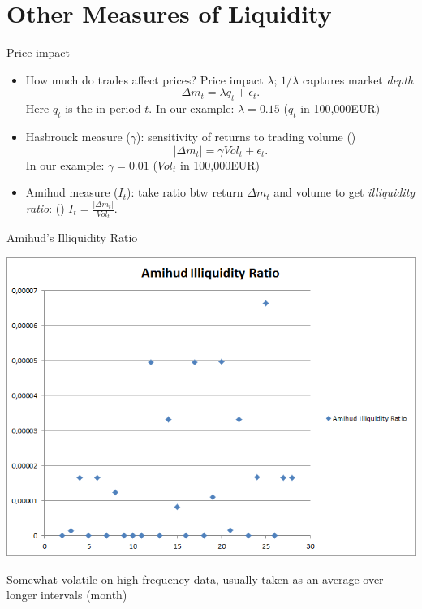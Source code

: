 \documentclass[english,10pt
,aspectratio=169
]{beamer}
\begin{document}
\section{Other Measures of Liquidity}


\begin{frame}{Price impact}
\begin{itemize}
	\item How much do trades affect prices? \alert{Price impact} $\lambda$;  $1/\lambda$ captures market \textit{depth}
	\[
	\Delta m_t = \lambda q_t + \epsilon_t.
	\]
	Here $q_t$ is the  in period $t$. 	
	In our example: $\lambda = 0.15 $ ($q_t$ in 100,000EUR)
	
	\pause
	\item \alert{Hasbrouck measure} ($\gamma$): sensitivity of returns to trading volume (\citet{hasbrouck_empirical_2007})
	\[
	|\Delta m_t | = \gamma Vol_t + \epsilon_t.
	\]
	In our example: $\gamma = 0.01$ ($Vol_t$ in 100,000EUR)
	
	\pause
	\item \alert{Amihud measure} ($I_t$): take ratio btw return $\Delta m_t$ and volume to get \textit{illiquidity ratio}: (\citet{amihud_illiquidity_2002})
	\center
	$I_t = \frac{|\Delta m_t|}{Vol_t}$.
\end{itemize}
\end{frame}


\begin{frame}{Amihud's Illiquidity Ratio}
\begin{center}
	\includegraphics[scale=0.39]{pics/L2_Amihud}
\end{center}
Somewhat volatile on high-frequency data, usually taken as an average over longer intervals (month)
\end{frame}
\end{document}
